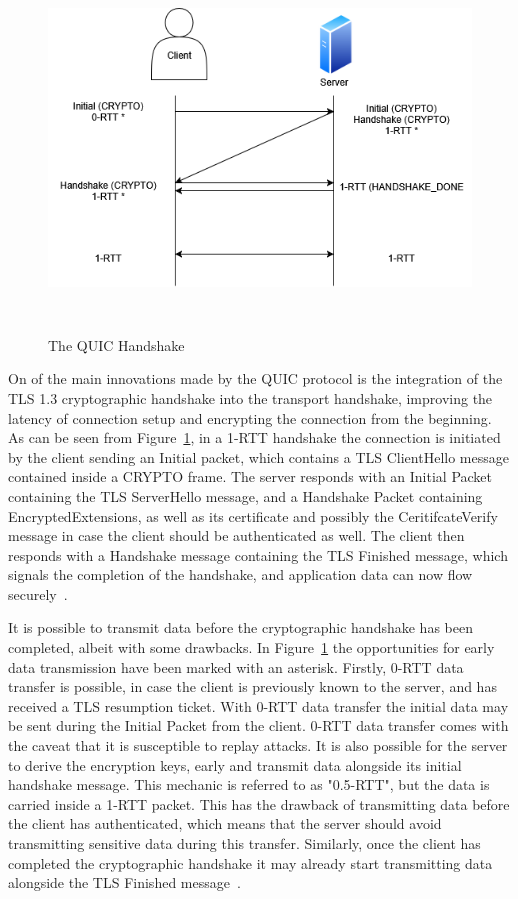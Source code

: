 \documentclass[english, 12pt, a4paper, elec, utf8, a-2b, online]{aaltothesis}
\begin{document}
\begin{figure}[h]
	\centering
	\includegraphics[alt={Diagram of QUIC handshake between a client and a server}, height=9cm]{./images/quic_handshake.png}
	\caption{The QUIC Handshake}
	\label{fig:quic_handshake}
\end{figure}

On of the main innovations made by the QUIC protocol is the integration of the
TLS 1.3 cryptographic handshake into the transport handshake, improving the latency
of connection setup and encrypting the connection from the beginning. As can be
seen from Figure~\ref{fig:quic_handshake}, in a 1-RTT handshake the connection is initiated by the client
sending an Initial packet, which contains a TLS ClientHello message
contained inside a CRYPTO frame. The server responds with an Initial Packet containing
the TLS ServerHello message, and a Handshake Packet containing EncryptedExtensions, as
well as its certificate and possibly the CeritifcateVerify message in case the client
should be authenticated as well. The client then responds with a Handshake message
containing the TLS Finished message, which signals the completion of the handshake,
and application data can now flow securely~\cite{rfc9000, rfc9001}.

It is possible to transmit data before the cryptographic handshake has been completed,
albeit with some drawbacks. In Figure~\ref{fig:quic_handshake} the opportunities
for early data transmission have been marked with an asterisk. Firstly, 0-RTT data
transfer is possible, in case the client is previously known to the server, and
has received a TLS resumption ticket. With 0-RTT data transfer the initial data may be sent during the Initial Packet
from the client. 0-RTT data transfer comes with the caveat that it is susceptible
to replay attacks. It is also possible for the server to derive the encryption keys,
early and transmit data alongside its initial handshake message. This mechanic is
referred to as "0.5-RTT", but the data is carried inside a 1-RTT packet. This has
the drawback of transmitting data before the client has authenticated, which means
that the server should avoid transmitting sensitive data during this transfer. Similarly,
once the client has completed the cryptographic handshake it may already start
transmitting data alongside the TLS Finished message~\cite{rfc9000, rfc9001}.
\end{document}
